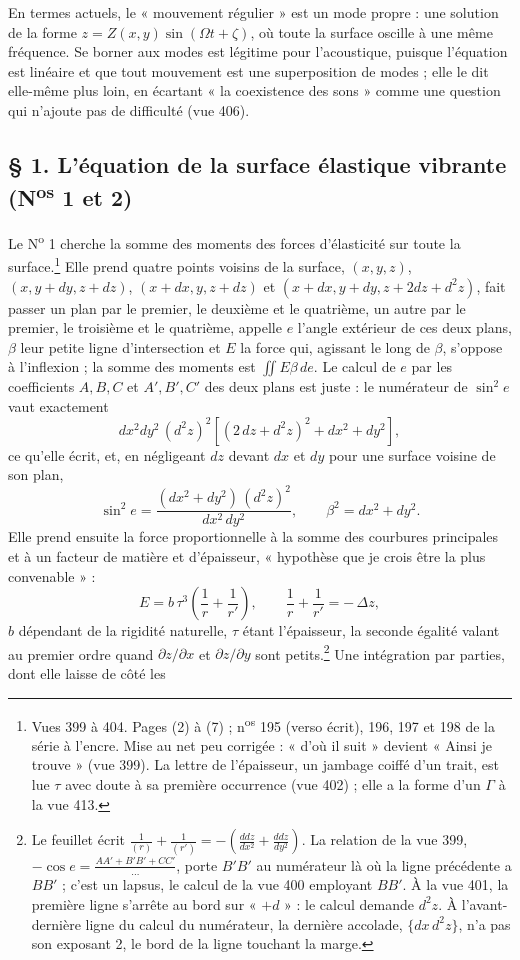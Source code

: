 \documentclass[11pt,a4paper]{article}
\begin{document}
En termes actuels, le « mouvement régulier » est un mode propre : une solution de la
forme $z = Z(x,y)\sin(\Omega t + \zeta)$, où toute la surface oscille à une même
fréquence. Se borner aux modes est légitime pour l'acoustique, puisque l'équation est
linéaire et que tout mouvement est une superposition de modes ; elle le dit elle-même
plus loin, en écartant « la coexistence des sons » comme une question qui n'ajoute pas
de difficulté (vue 406).

\subsection*{§ 1. L'équation de la surface élastique vibrante (N\textsuperscript{os} 1 et 2)}

Le N\textsuperscript{o} 1 cherche la somme des moments des forces d'élasticité sur
toute la surface.\footnote{Vues 399 à 404. Pages (2) à (7) ; n\textsuperscript{os}
195 (verso écrit), 196, 197 et 198 de la série à l'encre. Mise au net peu corrigée :
« d'où il suit » devient « Ainsi je trouve » (vue 399). La lettre de l'épaisseur,
un jambage coiffé d'un trait, est lue $\tau$ avec doute à sa première occurrence (vue
402) ; elle a la forme d'un $\Gamma$ à la vue 413.} Elle prend quatre points voisins
de la surface, $(x,y,z)$, $(x, y+dy, z+dz)$, $(x+dx, y, z+dz)$ et
$(x+dx, y+dy, z+2dz+d^2z)$, fait passer un plan par le premier, le deuxième et le
quatrième, un autre par le premier, le troisième et le quatrième, appelle $e$ l'angle
extérieur de ces deux plans, $\beta$ leur petite ligne d'intersection et $E$ la force
qui, agissant le long de $\beta$, s'oppose à l'inflexion ; la somme des moments est
$\iint E\beta\,de$. Le calcul de $e$ par les coefficients $A, B, C$ et $A', B', C'$ des
deux plans est juste : le numérateur de $\sin^2 e$ vaut exactement
\[
dx^2dy^2\,(d^2z)^2\left[(2\,dz + d^2z)^2 + dx^2 + dy^2\right],
\]
ce qu'elle écrit, et, en négligeant $dz$ devant $dx$ et $dy$ pour une surface voisine
de son plan,
\[
\sin^2 e = \frac{(dx^2+dy^2)\,(d^2z)^2}{dx^2\,dy^2}, \qquad \beta^2 = dx^2 + dy^2 .
\]
Elle prend ensuite la force proportionnelle à la somme des courbures principales et à
un facteur de matière et d'épaisseur, « hypothèse que je crois être la plus
convenable » :
\[
E = b\,\tau^3\left(\frac{1}{r} + \frac{1}{r'}\right), \qquad
\frac{1}{r} + \frac{1}{r'} = -\,\Delta z ,
\]
$b$ dépendant de la rigidité naturelle, $\tau$ étant l'épaisseur, la seconde égalité
valant au premier ordre quand $\partial z/\partial x$ et $\partial z/\partial y$ sont
petits.\footnote{Le feuillet écrit $\frac{1}{(r)}+\frac{1}{(r')} = -\left(\frac{ddz}{dx^2}+\frac{ddz}{dy^2}\right)$.
La relation de la vue 399, $-\cos e = \frac{AA'+B'B'+CC'}{\ldots}$, porte $B'B'$ au
numérateur là où la ligne précédente a $BB'$ ; c'est un lapsus, le calcul de la vue
400 employant $BB'$. À la vue 401, la première ligne s'arrête au bord sur « $+d$ » :
le calcul demande $d^2z$. À l'avant-dernière ligne du calcul du numérateur, la
dernière accolade, $\{dx\,d^2z\}$, n'a pas son exposant 2, le bord de la ligne
touchant la marge.} Une intégration par parties, dont elle laisse de côté les
\end{document}
